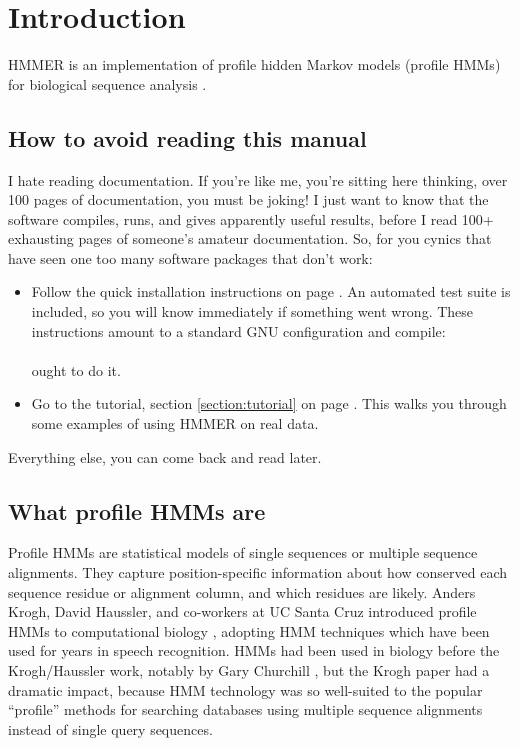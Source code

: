 \section{Introduction}

HMMER is an implementation of profile hidden Markov models (profile
HMMs) for biological sequence analysis
\citep{Krogh94,Eddy98,Durbin98}. 

\subsection{How to avoid reading this manual}

I hate reading documentation. If you're like me, you're sitting here
thinking, over 100 pages of documentation, you must be joking! I just
want to know that the software compiles, runs, and gives apparently
useful results, before I read 100+ exhausting pages of someone's
amateur documentation. So, for you cynics that have seen one too many
software packages that don't work:

\begin{itemize}
\item Follow the quick installation instructions on page
      \pageref{section:installation}. An automated test suite is
      included, so you will know immediately if something went
      wrong. These instructions amount to a standard GNU configuration
      and compile:\\
         \\
      ought to do it.

\item Go to the tutorial, section \ref{section:tutorial} on page
      \pageref{section:tutorial}. This walks you through some examples of
      using HMMER on real data.
\end{itemize}

Everything else, you can come back and read later.

\subsection{What profile HMMs are}

Profile HMMs are statistical models of single sequences or multiple
sequence alignments. They capture position-specific information about
how conserved each sequence residue or alignment column, and which
residues are likely.  Anders Krogh, David Haussler, and co-workers at
UC Santa Cruz introduced profile HMMs to computational biology
\cite{Krogh94}, adopting HMM techniques which have been used for years
in speech recognition. HMMs had been used in biology before the
Krogh/Haussler work, notably by Gary Churchill \cite{Churchill89}, but
the Krogh paper had a dramatic impact, because HMM technology was so
well-suited to the popular ``profile'' methods for searching databases
using multiple sequence alignments instead of single query sequences.

